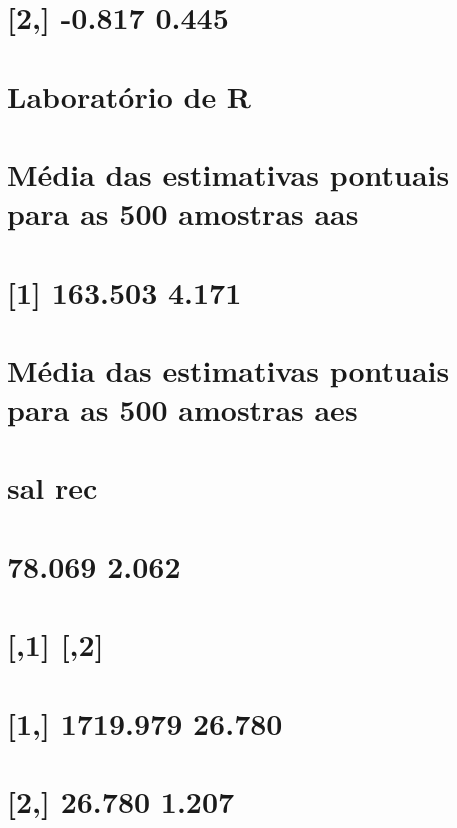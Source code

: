 \documentclass[]{book}
\theoremstyle{definition}
\theoremstyle{definition}
\theoremstyle{definition}
\theoremstyle{remark}
\begin{document}
\section{{[}2,{]} -0.817 0.445}\label{section-25}

\section{Laboratório de R}\label{laboratorio-de-r-1}

\section{Média das estimativas pontuais para as 500 amostras
aas}\label{media-das-estimativas-pontuais-para-as-500-amostras-aas}

\section{{[}1{]} 163.503 4.171}\label{section-26}

\section{Média das estimativas pontuais para as 500 amostras
aes}\label{media-das-estimativas-pontuais-para-as-500-amostras-aes}

\section{sal rec}\label{sal-rec-4}

\section{78.069 2.062}\label{section-27}

\section{{[},1{]} {[},2{]}}\label{section-28}

\section{{[}1,{]} 1719.979 26.780}\label{section-29}

\section{{[}2,{]} 26.780 1.207}\label{section-30}
\end{document}
